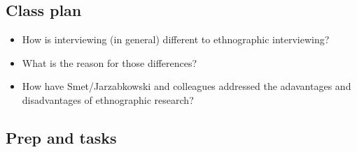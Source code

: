 \documentclass[]{book}
\theoremstyle{definition}
\theoremstyle{definition}
\theoremstyle{definition}
\theoremstyle{remark}
\begin{document}
\hypertarget{class-plan-6}{%
\subsection*{Class plan}\label{class-plan-6}}

\begin{itemize}
\item
  How is interviewing (in general) different to ethnographic
  interviewing?
\item
  What is the reason for those differences?
\item
  How have Smet/Jarzabkowski and colleagues addressed the adavantages
  and disadvantages of ethnographic research?
\end{itemize}

\hypertarget{prep-and-tasks-6}{%
\subsection*{Prep and tasks}\label{prep-and-tasks-6}}
\end{document}
